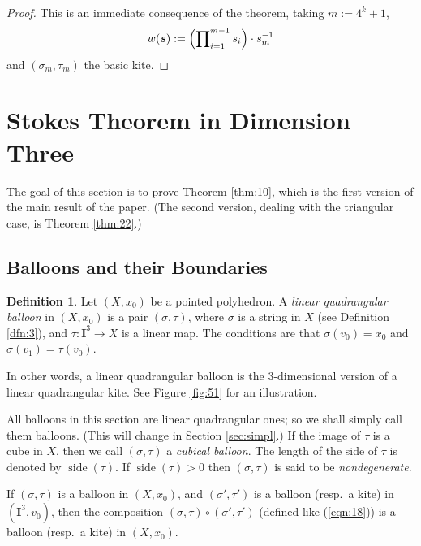 \documentclass[10pt, a4paper]{amsart}
\theoremstyle{definition}
\newtheorem{dfn}[equation]{Definition}
\numberwithin{equation}{section}
\newcommand{\opn}{\operatorname}
\newcommand{\mbf}[1]{\mathbf{#1}}
\newcommand{\bsym}[1]{\boldsymbol{#1}}
\begin{document}
\begin{proof}
This is an immediate consequence of the theorem, taking
$m := 4^k + 1$,  
\[ w(\bsym{s}) := \Bigl( \prod\nolimits_{i = 1}^{m - 1} s_i \Bigr) 
\cdot s_m^{-1}  \]
and $(\sigma_m, \tau_m)$ the basic kite. 
\end{proof}








\cleardoublepage
\section{Stokes Theorem in Dimension Three}
\label{sec:stokes-3}

The goal of this section is to prove Theorem \ref{thm:10}, which is the first
version of the main result of the paper. (The second version, dealing with the
triangular case, is Theorem \ref{thm:22}.)

\subsection{Balloons and their Boundaries} \label{subsec:ballbound}

\begin{dfn}
Let $(X, x_0)$ be a pointed polyhedron. A {\em linear quadrangular balloon} 
in $(X, x_0)$ is a pair $(\sigma, \tau)$, where
$\sigma$ is a string in $X$ (see Definition \ref{dfn:3}), and
$\tau : \mbf{I}^3 \to X$ is a linear map. The conditions are that
$\sigma(v_0) = x_0$ and $\sigma(v_1) = \tau(v_0)$.
\end{dfn}

In other words, a linear quadrangular balloon is the $3$-dimensional version of
a linear quadrangular kite. See Figure \ref{fig:51} for an illustration. 

All balloons in this section are linear quadrangular ones; so we shall
simply call them balloons. (This will change in Section \ref{sec:simpl}.)
If the image of $\tau$ is a cube in $X$, then we call 
$(\sigma, \tau)$ a {\em cubical balloon}. The length of the side of $\tau$ is
denoted by $\opn{side}(\tau)$. If $\opn{side}(\tau) > 0$ then 
$(\sigma, \tau)$ is said to be {\em nondegenerate}.

If $(\sigma, \tau)$ is a balloon in $(X, x_0)$, and
$(\sigma', \tau')$ is a balloon (resp.\ a kite) in $(\mbf{I}^{3}, v_0)$, then 
the composition $(\sigma, \tau) \circ (\sigma', \tau')$
(defined like (\ref{eqn:18})) is a balloon  (resp.\ a kite) in $(X, x_0)$.
\end{document}
